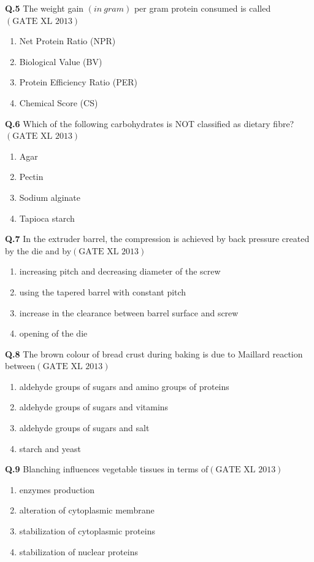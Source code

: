 \documentclass[12pt]{article}
\theoremstyle{remark}
\providecommand{\brak}[1]{\ensuremath{\left(#1\right)}}
\begin{document}
\textbf{Q.5} The weight gain \brak{in\  gram} per gram protein consumed is called\hfill $\brak{\text{GATE XL 2013}}$
\begin{enumerate}
    \item Net Protein Ratio (NPR)
    \item Biological Value (BV)
    \item Protein Efficiency Ratio (PER)
    \item Chemical Score (CS)
\end{enumerate}

\textbf{Q.6} Which of the following carbohydrates is NOT classified as dietary fibre?\hfill $\brak{\text{GATE XL 2013}}$
\begin{enumerate}
    \item Agar
    \item Pectin
    \item Sodium alginate
    \item Tapioca starch
\end{enumerate}

\textbf{Q.7} In the extruder barrel, the compression is achieved by back pressure created by the die and by\hfill $\brak{\text{GATE XL 2013}}$
\begin{enumerate}
    \item increasing pitch and decreasing diameter of the screw
    \item using the tapered barrel with constant pitch
    \item increase in the clearance between barrel surface and screw
    \item opening of the die
\end{enumerate}

\textbf{Q.8} The brown colour of bread crust during baking is due to Maillard reaction between\hfill $\brak{\text{GATE XL 2013}}$
\begin{enumerate}
    \item aldehyde groups of sugars and amino groups of proteins
    \item aldehyde groups of sugars and vitamins
    \item aldehyde groups of sugars and salt
    \item starch and yeast
\end{enumerate}

\textbf{Q.9} Blanching influences vegetable tissues in terms of\hfill $\brak{\text{GATE XL 2013}}$
\begin{enumerate}
    \item enzymes production
    \item alteration of cytoplasmic membrane
    \item stabilization of cytoplasmic proteins
    \item stabilization of nuclear proteins
\end{enumerate}
\end{document}
